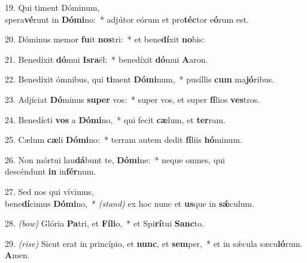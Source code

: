19. Qui timent Dóminum,\\ spera\textbf{vé}runt in \textbf{Dó}\textbf{mi}no:~* 
	adjútor eórum et pro\textbf{téc}tor e\textbf{ó}rum est.

20. Dóminus memor \textbf{fu}it \textbf{nos}tri:~* 
	et bene\textbf{dí}xit \textbf{no}bis:

21. Benedíxit \textbf{dó}mui \textbf{Is}\textbf{ra}ël:~* 
	benedíxit \textbf{dó}mui \textbf{A}aron.

22. Benedíxit ómnibus, qui \textbf{ti}ment \textbf{Dó}\textbf{mi}num,~* 
	pusíllis \textbf{cum} ma\textbf{jó}ribus.

23. Adjíciat \textbf{Dó}minus \textbf{su}\textbf{per} vos:~* 
	super vos, et super \textbf{fí}lios \textbf{ves}tros.

24. Benedícti \textbf{vos} a \textbf{Dó}\textbf{mi}no,~* 
	qui fecit \textbf{cæ}lum, et \textbf{ter}ram.

25. Cælum \textbf{cæ}li \textbf{Dó}\textbf{mi}no:~* 
	terram autem dedit \textbf{fí}liis \textbf{hó}minum.

26. Non mórtui lau\textbf{dá}bunt te, \textbf{Dó}\textbf{mi}ne:~* 
	neque omnes, qui\\ descéndunt \textbf{in} in\textbf{fér}num.

27. Sed nos qui vívimus,\\ bene\textbf{dí}cimus \textbf{Dó}\textbf{mi}no,~* 
	{\color{red}\textit{(stand)}} ex hoc nunc et \textbf{us}que in \textbf{s\'{\ae}}culum.

28. {\color{red}\textit{(bow)}} Glória \textbf{Pa}tri, et \textbf{Fí}\textbf{li}o,~* 
	et Spi\textbf{rí}tui \textbf{Sanc}to.

29. {\color{red}\textit{(rise)}} Sicut erat in princípio, et \textbf{nunc}, et \textbf{sem}per,~* 
	et in s\'{\ae}cula sæcu\textbf{ló}rum. \textbf{A}men.
